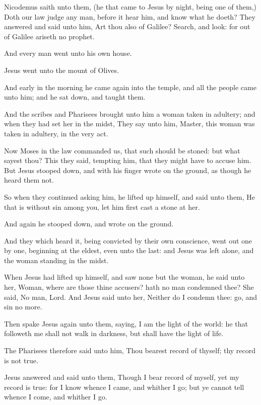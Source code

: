 \Verse Nicodemus saith unto them, (he that came to Jesus by night, being one of them,) \Verse Doth our law judge any man, before it hear him, and know what he doeth?  \Verse They answered and said unto him, Art thou also of Galilee?  Search, and look: for out of Galilee ariseth no prophet.

\Verse And every man went unto his own house.


\Chapter
\Verse Jesus went unto the mount of Olives.

\Verse And early in the morning he came again into the temple, and all the people came unto him; and he sat down, and taught them.

\Verse And the scribes and Pharisees brought unto him a woman taken in adultery; and when they had set her in the midst, \Verse They say unto him, Master, this woman was taken in adultery, in the very act.

\Verse Now Moses in the law commanded us, that such should be stoned: but what sayest thou?  \Verse This they said, tempting him, that they might have to accuse him. But Jesus stooped down, and with his finger wrote on the ground, as though he heard them not.

\Verse So when they continued asking him, he lifted up himself, and said unto them, He that is without sin among you, let him first cast a stone at her.

\Verse And again he stooped down, and wrote on the ground.

\Verse And they which heard it, being convicted by their own conscience, went out one by one, beginning at the eldest, even unto the last: and Jesus was left alone, and the woman standing in the midst.

\Verse When Jesus had lifted up himself, and saw none but the woman, he said unto her, Woman, where are those thine accusers? hath no man condemned thee?  \Verse She said, No man, Lord. And Jesus said unto her, Neither do I condemn thee: go, and sin no more.

\Verse Then spake Jesus again unto them, saying, I am the light of the world: he that followeth me shall not walk in darkness, but shall have the light of life.

\Verse The Pharisees therefore said unto him, Thou bearest record of thyself; thy record is not true.

\Verse Jesus answered and said unto them, Though I bear record of myself, yet my record is true: for I know whence I came, and whither I go; but ye cannot tell whence I come, and whither I go.

